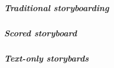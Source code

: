 \begin{tool}[Storyboard] \label{meth:storyboard} 
  
\end{tool}

\subparagraph{Traditional storyboarding}

\subparagraph{Scored storyboard}

\subparagraph{Text-only storybards}

